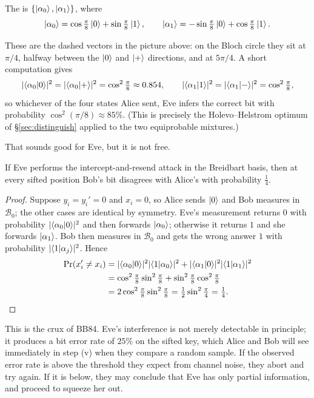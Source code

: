 \documentclass[a4paper]{scrartcl}
\newcommand{\Bs}{\mathcal{B}}
\begin{document}
\begin{definition}
	The  is $\{\ket{\alpha_0},\ket{\alpha_1}\}$, where
	$$\ket{\alpha_0} = \cos\tfrac{\pi}{8}\ket{0} + \sin\tfrac\pi8\ket{1}, \qquad \ket{\alpha_1} = -\sin\tfrac\pi8\ket{0}+\cos\tfrac\pi8\ket{1}.$$
\end{definition}

These are the dashed vectors in the picture above: on the Bloch circle they sit at $\pi/4$, halfway between the $\ket{0}$ and $\ket{+}$ directions, and at $5\pi/4$. A short computation gives
$$\abs{\ip{\alpha_0}{0}}^2 = \abs{\ip{\alpha_0}{+}}^2 = \cos^2\tfrac\pi8 \approx 0.854, \qquad \abs{\ip{\alpha_1}{1}}^2 = \abs{\ip{\alpha_1}{-}}^2 = \cos^2\tfrac\pi8,$$
so whichever of the four states Alice sent, Eve infers the correct bit with probability $\cos^2(\pi/8) \approx 85\%$. (This is precisely the Holevo--Helstrom optimum of \S\ref{sec:distinguish} applied to the two equiprobable mixtures.)

That sounds good for Eve, but it is not free.

\begin{proposition}
	If Eve performs the intercept-and-resend attack in the Breidbart basis, then at every sifted position Bob's bit disagrees with Alice's with probability $\tfrac14$.
\end{proposition}

\begin{proof}
	Suppose $y_i = y_i' = 0$ and $x_i = 0$, so Alice sends $\ket{0}$ and Bob measures in $\Bs_0$; the other cases are identical by symmetry. Eve's measurement returns $0$ with probability $\abs{\ip{\alpha_0}{0}}^2$ and then forwards $\ket{\alpha_0}$; otherwise it returns $1$ and she forwards $\ket{\alpha_1}$. Bob then measures in $\Bs_0$ and gets the wrong answer $1$ with probability $\abs{\ip{1}{\alpha_j}}^2$. Hence
	\begin{align*}
		\Pr(x_i'\neq x_i) &= \abs{\ip{\alpha_0}{0}}^2\abs{\ip{1}{\alpha_0}}^2 + \abs{\ip{\alpha_1}{0}}^2\abs{\ip{1}{\alpha_1}}^2 \\
		&= \cos^2\tfrac\pi8\sin^2\tfrac\pi8 + \sin^2\tfrac\pi8\cos^2\tfrac\pi8 \\
		&= 2\cos^2\tfrac\pi8\sin^2\tfrac\pi8 = \tfrac12\sin^2\tfrac\pi4 = \tfrac14. \qedhere
	\end{align*}
\end{proof}

This is the crux of BB84. Eve's interference is not merely detectable in principle; it produces a bit error rate of $25\%$ on the sifted key, which Alice and Bob will see immediately in step (v) when they compare a random sample. If the observed error rate is above the threshold they expect from channel noise, they abort and try again. If it is below, they may conclude that Eve has only partial information, and proceed to squeeze her out.
\end{document}
